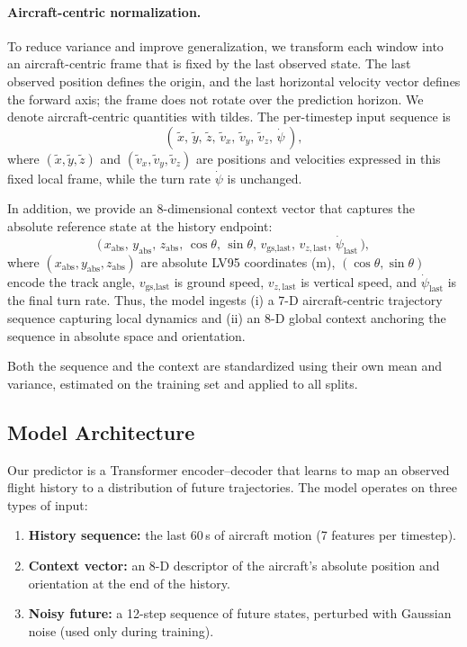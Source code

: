 \documentclass[
  manuscript=proceedings,  %
  layout=preprint,  %
  year=20xx,
  volume=x,
]{extra/joas}
\begin{document}
\paragraph{Aircraft-centric normalization.}
To reduce variance and improve generalization, we transform each window into an aircraft-centric frame that is fixed by the last observed state. The last observed position defines the origin, and the last horizontal velocity vector defines the forward axis; the frame does not rotate over the prediction horizon. We denote aircraft-centric quantities with tildes. The per-timestep input sequence is
\[
(\,\tilde{x},\, \tilde{y},\, \tilde{z},\, \tilde{v}_x,\, \tilde{v}_y,\, \tilde{v}_z,\, \dot{\psi}\,),
\]
where $(\tilde{x},\tilde{y},\tilde{z})$ and $(\tilde{v}_x,\tilde{v}_y,\tilde{v}_z)$ are positions and velocities expressed in this fixed local frame, while the turn rate $\dot{\psi}$ is unchanged.

In addition, we provide an 8-dimensional context vector that captures the absolute reference state at the history endpoint:
\[
\bigl(\, x_{\text{abs}},\, y_{\text{abs}},\, z_{\text{abs}},\, \cos\theta,\, \sin\theta,\, v_{\text{gs,last}},\, v_{z,\text{last}},\, \dot{\psi}_{\text{last}} \,\bigr),
\]
where $(x_{\text{abs}},y_{\text{abs}},z_{\text{abs}})$ are absolute LV95 coordinates (m), $(\cos\theta,\sin\theta)$ encode the track angle, $v_{\text{gs,last}}$ is ground speed, $v_{z,\text{last}}$ is vertical speed, and $\dot{\psi}_{\text{last}}$ is the final turn rate. Thus, the model ingests (i) a 7-D aircraft-centric trajectory sequence capturing local dynamics and (ii) an 8-D global context anchoring the sequence in absolute space and orientation.

Both the sequence and the context are standardized using their own mean and variance, estimated on the training set and applied to all splits.

\subsection{Model Architecture}

Our predictor is a Transformer encoder–decoder that learns to map an observed flight history to a distribution of future trajectories. The model operates on three types of input:

\begin{enumerate}
    \item \textbf{History sequence:} the last $60$\,s of aircraft motion (7 features per timestep).
    \item \textbf{Context vector:} an 8-D descriptor of the aircraft’s absolute position and orientation at the end of the history.
    \item \textbf{Noisy future:} a 12-step sequence of future states, perturbed with Gaussian noise (used only during training).
\end{enumerate}
\end{document}
